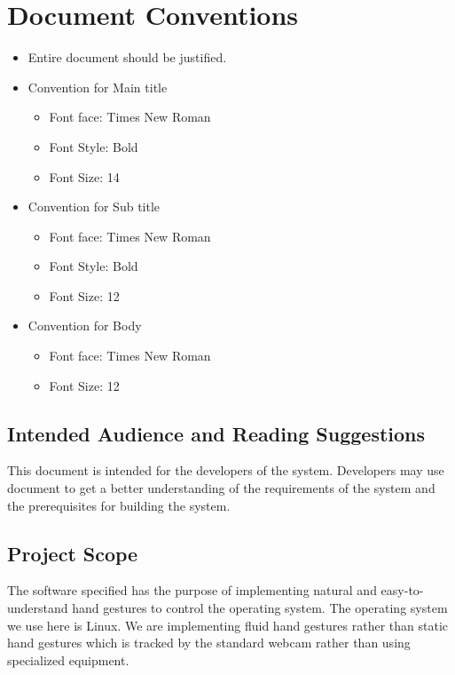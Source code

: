 \documentclass[11pt]{report}
\begin{document}
\section{Document Conventions}
\begin{itemize}
    \item Entire document should be justified.
    \item Convention for Main title
\begin{itemize}
    \item Font face: Times New Roman
\item Font Style: Bold
\item Font Size: 14
\end{itemize}
    
\item Convention for Sub title
\begin{itemize}
    
\item  Font face: Times New Roman
\item Font Style: Bold
\item Font Size: 12
\end{itemize}
\item Convention for Body

\begin{itemize}
    
\item Font face: Times New Roman
\item Font Size: 12
\end{itemize}
\end{itemize}

\subsection{Intended Audience and Reading Suggestions}
This document is intended for the developers of the system. Developers may use document to get a better understanding of the requirements of the system and the prerequisites for building the system.

\subsection{Project Scope}
The software specified has the purpose of implementing natural and easy-to-understand hand gestures to control the operating system. The operating system we use here is Linux. We are implementing fluid hand gestures rather than static hand gestures which is tracked by the standard webcam rather than using specialized equipment.
\end{document}
